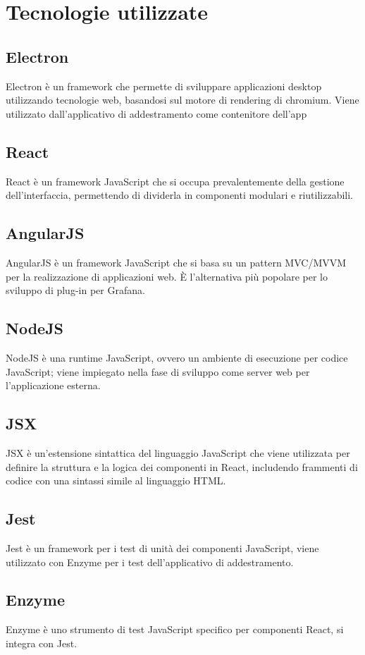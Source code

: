\section{Tecnologie utilizzate}
	\subsection{Electron}
		Electron è un framework che permette di sviluppare applicazioni desktop utilizzando tecnologie web, basandosi sul motore di rendering di chromium. Viene utilizzato dall'applicativo di addestramento come contenitore dell'app
	\subsection{React}
		React è un framework JavaScript che si occupa prevalentemente della gestione dell'interfaccia, permettendo di dividerla in componenti modulari e riutilizzabili.
	\subsection{AngularJS}
		AngularJS è un framework JavaScript che si basa su un pattern MVC/MVVM per la realizzazione di applicazioni web. È l'alternativa più popolare per lo sviluppo di plug-in per Grafana\glo.
	\subsection{NodeJS}
		NodeJS è una runtime JavaScript, ovvero un ambiente di esecuzione per codice JavaScript; viene impiegato nella fase di sviluppo come server web per l'applicazione esterna.
	\subsection{JSX}
		JSX è un'estensione sintattica del linguaggio JavaScript che viene utilizzata per definire la struttura e la logica dei componenti in React, includendo frammenti di codice con una sintassi simile al linguaggio HTML.
	\subsection{Jest}
		Jest è un framework per i test di unità dei componenti JavaScript, viene utilizzato con Enzyme per i test dell'applicativo di addestramento.
	\subsection{Enzyme}
		Enzyme è uno strumento di test JavaScript specifico per componenti React, si integra con Jest.
